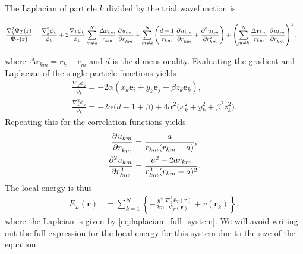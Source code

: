\documentclass[
    a4paper, aps, twocolumn, floatfix, superscriptaddress,
    nofootinbib]{revtex4-1}
\newcommand{\vf}{\mathbf}
\newcommand{\1}{\mathds{1}}
\newcommand{\para}[1]{\left(#1\right)}
\newcommand{\brac}[1]{\left\{#1\right\}}
\begin{document}
        The Laplacian of particle $k$ divided by the trial wavefunction is
        \begin{widetext}
            \begin{align}
                \frac{\nabla_k^2\Psi_T(\vf{r})}{\Psi_T(\vf{r})}
                &=
                \frac{\nabla_k^2\phi_k}{\phi_k}
                + 2\frac{\nabla_k\phi_k}{\phi_k}
                \sum_{m \neq k}^N
                \frac{\Delta\vf{r}_{km}}{r_{km}}
                \dpd[]{u_{km}}{r_{km}}
                + \sum_{m\neq k}^N
                \para{
                    \frac{d - 1}{r_{km}}\dpd[]{u_{km}}{r_{km}}
                    + \dpd[2]{u_{km}}{r_{km}}
                }
                +
                \para{
                    \sum_{m \neq k}^N
                    \frac{\Delta\vf{r}_{km}}{r_{km}}
                    \dpd[]{u_{km}}{r_{km}}
                }^2,
                \label{eq:laplacian_full_system}
            \end{align}
        \end{widetext}
        where $\Delta \vf{r}_{km} = \vf{r}_k - \vf{r}_m$ and $d$ is the
        dimensionality. Evaluating the gradient and Laplacian of the single
        particle functions yields
        \begin{gather}
            \frac{\nabla_k\phi_k}{\phi_k}
            =
            -2\alpha
            (x_k\vf{e}_i + y_k\vf{e}_j + \beta z_k\vf{e}_k),
            \\
            \frac{\nabla_k^2\phi_k}{\phi_k}
            =
            -2\alpha
            \big(
                d - 1 + \beta
            \bigr)
            + 4\alpha^2
            \bigl(
                x_k^2 + y_k^2 + \beta^2z_k^2
            \bigr).
        \end{gather}
        Repeating this for the correlation functions yields
        \begin{align}
            \dpd[]{u_{km}}{r_{km}}
            &=
            \frac{a}{r_{km}(r_{km} - a)},
            \\
            \dpd[2]{u_{km}}{r_{km}}
            &= \frac{a^2 - 2ar_{km}}{r_{km}^2(r_{km} - a)^2}.
        \end{align}
        The local energy is thus
        \begin{align}
            E_L(\vf{r})
            &=
            \sum_{k = 1}^N
            \brac{
                -\frac{\hbar^2}{2m}
                \frac{\nabla_k^2\Psi_T(\vf{r})}{\Psi_T(\vf{r})}
                + v(\vf{r}_k)
            },
        \end{align}
        where the Laplcian is given by \autoref{eq:laplacian_full_system}.  We
        will avoid writing out the full expression for the local energy for this
        system due to the size of the equation.
\end{document}
